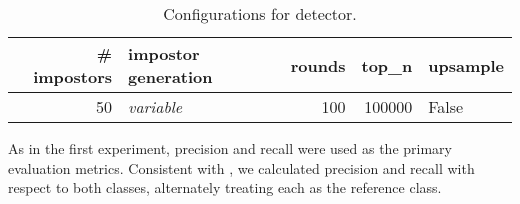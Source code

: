 \begin{table}[h]
\centering\small
\caption{Configurations for detector.}
\label{tab:repr_exp2}
\begin{tabular}{@{}rlrrl@{}}   %
\toprule
\# impostors & impostor generation & rounds & top\_n & upsample \\
\midrule
50 & \textit{variable} & 100 & \num{100000} & False \\
\bottomrule
\end{tabular}%
\end{table}

As in the first experiment, precision and recall were used as the primary evaluation metrics. 
Consistent with \citet{koppel_determining_2014}, we calculated precision and recall with respect to both classes, alternately treating each as the reference class.
